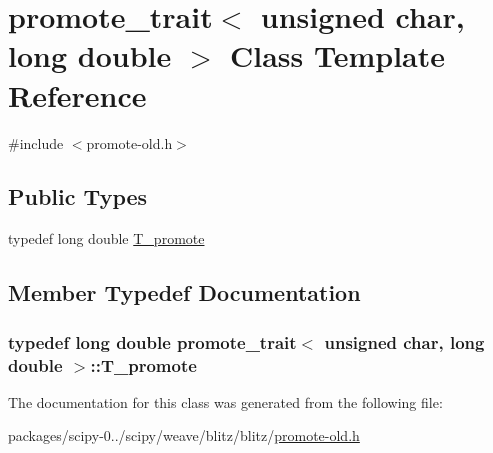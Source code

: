 \hypertarget{classpromote__trait_3_01unsigned_01char_00_01long_01double_01_4}{}\section{promote\+\_\+trait$<$ unsigned char, long double $>$ Class Template Reference}
\label{classpromote__trait_3_01unsigned_01char_00_01long_01double_01_4}


{\ttfamily \#include $<$promote-\/old.\+h$>$}

\subsection*{Public Types}
\begin{DoxyCompactItemize}
\item 
typedef long double \hyperlink{classpromote__trait_3_01unsigned_01char_00_01long_01double_01_4_a5df513ed0b275cc8d573814b57948003}{T\+\_\+promote}
\end{DoxyCompactItemize}


\subsection{Member Typedef Documentation}
\hypertarget{classpromote__trait_3_01unsigned_01char_00_01long_01double_01_4_a5df513ed0b275cc8d573814b57948003}{}
\subsubsection[{T\+\_\+promote}]{\setlength{\rightskip}{0pt plus 5cm}typedef long double {\bf promote\+\_\+trait}$<$ unsigned char, long double $>$\+::{\bf T\+\_\+promote}}\label{classpromote__trait_3_01unsigned_01char_00_01long_01double_01_4_a5df513ed0b275cc8d573814b57948003}


The documentation for this class was generated from the following file\+:\begin{DoxyCompactItemize}
\item 
packages/scipy-\/0../scipy/weave/blitz/blitz/\hyperlink{promote-old_8h}{promote-\/old.\+h}\end{DoxyCompactItemize}
